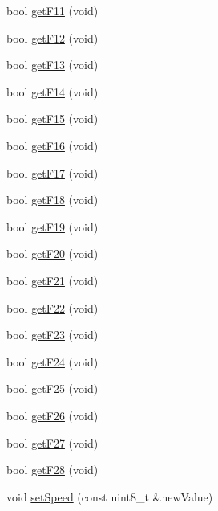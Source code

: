 \begin{DoxyCompactItemize}
\item 
bool \hyperlink{classIoTT_1_1LocDecoder_aad7f11ef18ea635b9e5d58dc64832017}{get\+F11} (void)
\item 
bool \hyperlink{classIoTT_1_1LocDecoder_a2fc9445e7b4facdd7fa8852a9e6ca6fe}{get\+F12} (void)
\item 
bool \hyperlink{classIoTT_1_1LocDecoder_ab9041afd0ee9bc6d0a6e03477a47ae90}{get\+F13} (void)
\item 
bool \hyperlink{classIoTT_1_1LocDecoder_ad3fdffa129425f810ec72b369fac7e36}{get\+F14} (void)
\item 
bool \hyperlink{classIoTT_1_1LocDecoder_a639d50b97eb7754675c26fe0066d49bf}{get\+F15} (void)
\item 
bool \hyperlink{classIoTT_1_1LocDecoder_a565ed71a5e034006022610cd8836fa85}{get\+F16} (void)
\item 
bool \hyperlink{classIoTT_1_1LocDecoder_a25e06f93ea583ba5d57da49648ac0461}{get\+F17} (void)
\item 
bool \hyperlink{classIoTT_1_1LocDecoder_a23dbff1707e2ba4244499a6ddc1279ea}{get\+F18} (void)
\item 
bool \hyperlink{classIoTT_1_1LocDecoder_abc67def845365957b27455f856697875}{get\+F19} (void)
\item 
bool \hyperlink{classIoTT_1_1LocDecoder_a02ad881bb20ee39b88070c0fd51be6b1}{get\+F20} (void)
\item 
bool \hyperlink{classIoTT_1_1LocDecoder_a18417f2b0554fc3f30da7fb6ef2578e3}{get\+F21} (void)
\item 
bool \hyperlink{classIoTT_1_1LocDecoder_af08144a3a55b211f75473617b3288667}{get\+F22} (void)
\item 
bool \hyperlink{classIoTT_1_1LocDecoder_aa998009e69fead22229bc588035cfb1f}{get\+F23} (void)
\item 
bool \hyperlink{classIoTT_1_1LocDecoder_a4bf9cf941641d03b6027033607fbec14}{get\+F24} (void)
\item 
bool \hyperlink{classIoTT_1_1LocDecoder_aa3b368525eb98890029ed0453047ef77}{get\+F25} (void)
\item 
bool \hyperlink{classIoTT_1_1LocDecoder_a9ca02c2708c4456ad0f0ebbba4deca4a}{get\+F26} (void)
\item 
bool \hyperlink{classIoTT_1_1LocDecoder_a12907d330923a254f019242ac63c1670}{get\+F27} (void)
\item 
bool \hyperlink{classIoTT_1_1LocDecoder_aba1303236c9df1cc15406a0abcdfd424}{get\+F28} (void)
\item 
void \hyperlink{classIoTT_1_1LocDecoder_a9ac45335c62250e8f64086e0a06f399a}{set\+Speed} (const uint8\+\_\+t \&new\+Value)

\end{DoxyCompactItemize}
